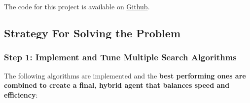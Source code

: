 The code for this project is available on \href{https://github.com/sidharrth2002/ci-quarto-sidharrth}{Github}.

\subsection{Strategy For Solving the Problem}

\subsubsection{Step 1: Implement and Tune Multiple Search Algorithms}

The following algorithms are implemented and the \textbf{best performing ones are combined to create a final, hybrid agent that balances speed and efficiency}:

